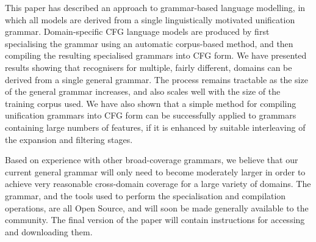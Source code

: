 \documentclass[11pt]{article}
\begin{document}
This paper has described an approach to grammar-based language
modelling, in which all models are derived from a single
linguistically motivated unification grammar. Domain-specific CFG
language models are produced by first specialising the grammar using
an automatic corpus-based method, and then compiling the resulting
specialised grammars into CFG form. We have presented results showing
that recognisers for multiple, fairly different, domains can be
derived from a single general grammar. The process remains tractable
as the size of the general grammar increases, and also scales well
with the size of the training corpus used. We have also shown
that a simple method for compiling unification grammars into CFG form
can be successfully applied to grammars containing large numbers of
features, if it is enhanced by suitable interleaving of the expansion
and filtering stages.

Based on experience with other broad-coverage grammars, we believe
that our current general grammar will only need to become moderately
larger in order to achieve very reasonable cross-domain coverage for a
large variety of domains. The grammar, and the tools used to perform
the specialisation and compilation operations, are all Open Source,
and will soon be made generally available to the community. The final
version of the paper will contain instructions for accessing and
downloading them.

%



\end{document}
